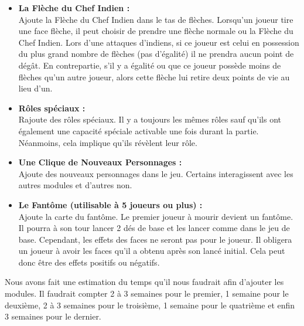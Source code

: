 \documentclass[a4paper,11pt]{article}
\begin{document}
\begin{itemize}
	\item \textbf{La Flèche du Chef Indien :}\\
	
	Ajoute la Flèche du Chef Indien dans le tas de flèches. Lorsqu'un joueur tire une face flèche, il peut choisir de prendre une flèche normale ou la Flèche du Chef Indien. Lors d'une attaques d'indiens, si ce joueur est celui en possession du plus grand nombre de flèches (pas d’égalité) il ne prendra aucun point de dégât. En contrepartie, s'il y a égalité ou que ce joueur possède moins de flèches qu’un autre joueur, alors cette flèche lui retire deux points de vie au lieu d’un. \\

	\item \textbf{Rôles spéciaux :} \\
	
	Rajoute des rôles spéciaux. Il y a toujours les mêmes rôles sauf qu’ils ont également une capacité spéciale activable une fois durant la partie. Néanmoins, cela implique qu’ils révèlent leur rôle. \\

	\item \textbf{Une Clique de Nouveaux Personnages :} \\
	
	 Ajoute des nouveaux personnages dans le jeu. Certains interagissent avec les autres modules et d’autres non. \\

	\item \textbf{Le Fantôme (utilisable à 5 joueurs ou plus) :}\\
	
	 Ajoute la carte du fantôme. Le premier joueur à mourir devient un fantôme. Il pourra à son tour lancer 2 dés de base et les lancer comme dans le jeu de base. Cependant, les effets des faces ne seront pas pour le joueur. Il obligera un joueur à avoir les faces qu’il a obtenu après son lancé initial. Cela peut donc être des effets positifs ou négatifs. \\

\end{itemize}


	Nous avons fait une estimation du temps qu’il nous faudrait afin d’ajouter les modules. Il faudrait compter 2 à 3 semaines pour le premier, 1 semaine pour le deuxième, 2 à 3 semaines pour le troisième, 1 semaine pour le quatrième et enfin 3 semaines pour le dernier. \\
\end{document}
